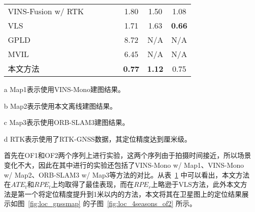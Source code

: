 \begin{table}
\begin{threeparttable}[c]
{\begin{tabular}{lccccccc}
VINS-Fusion w/  RTK &                                                                            &                      &                      &                      & 1.80          & 1.50          & 1.08          \\
VLS                                    &                                                                            &                      &                      &                      & 1.71          & 1.63          & \cellcolor[HTML]{FFCCC9}\textbf{0.66} \\
GPLD                                   &                                                                            &                      &                      &                      & 8.72          & N/A               & N/A               \\
MVIL                                   &                                                                            &                      &                      &                      & 6.45          & N/A               & N/A               \\
本文方法                                   &                                                                            &                      &                      &                      & \cellcolor[HTML]{FFCCC9}\textbf{0.77} & \cellcolor[HTML]{FFCCC9}\textbf{1.12} & 0.75          \\ \bottomrule
\end{tabular}}
\label{tab:loc_4seasons_of2}
\begin{tablenotes}
  \item [a] Map1表示使用VINS-Mono建图结果。
  \item [b] Map2表示使用本文离线建图结果。
  \item [c] Map3表示使用ORB-SLAM3建图结果。
  \item [d] RTK表示使用了RTK-GNSS数据，其定位精度达到厘米级。
\end{tablenotes}
\end{threeparttable}
\end{table}

首先在OF1和OF2两个序列上进行实验，这两个序列由于拍摄时间接近，所以场景变化不大，因此在其中进行的实验还包括了VINS-Mono w/ Map1、VINS-Mono w/ Map2、ORB-SLAM3 w/ Map3等方法的对比。从表~\ref{tab:loc_4seasons_of2} 中可以看出，本文方法在$ATE_t$和$RPE_t$上均取得了最佳表现，而在$RPE_r$上略逊于VLS方法，此外本文方法是第一个将定位精度提升到1米以内的方法，本文将其在卫星图上的定位结果展示如图~\ref{fig:loc_gnssmap} 的子图~\ref{fig:loc_4seasons_of2} 所示。

